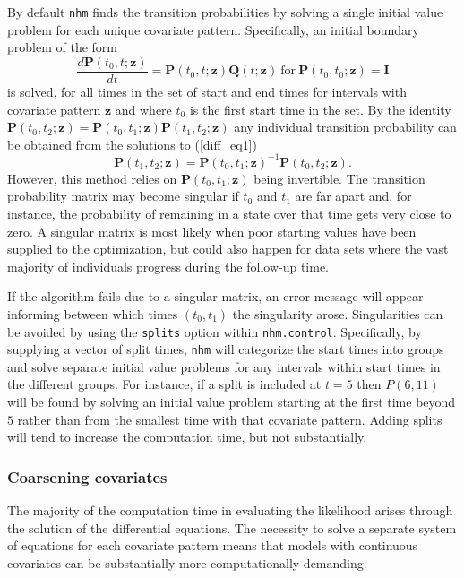\documentclass{article}
\numberwithin{equation}{section}
\begin{document}
By default \verb!nhm! finds the transition probabilities by solving a single initial value problem for each unique covariate pattern. Specifically, an initial boundary problem of the form
\begin{equation}\frac{d\mathbf{P}(t_0, t ; \mathbf{z})}{dt} = \mathbf{P}(t_0,t ; \mathbf{z})\mathbf{Q}(t ;  \mathbf{z}) ~ \mbox{for}  ~ \mathbf{P}(t_0,t_0 ; \mathbf{z}) = \mathbf{I} \label{diff_eq1} \end{equation}
is solved, for all times in the set of start and end times for intervals with covariate pattern $\mathbf{z}$ and where $t_0$ is the first start time in the set.
By the identity $\mathbf{P}(t_0 , t_2; \mathbf{z}) = \mathbf{P}(t_0 , t_1; \mathbf{z})\mathbf{P}(t_1 , t_2; \mathbf{z})$ any individual transition probability can be obtained from the solutions to (\ref{diff_eq1})
$$\mathbf{P}(t_1 , t_2; \mathbf{z}) = \mathbf{P}(t_0 , t_1; \mathbf{z})^{-1}\mathbf{P}(t_0 , t_2; \mathbf{z}).$$
However, this method relies on $\mathbf{P}(t_0 , t_1; \mathbf{z})$ being invertible. The transition probability matrix may become singular if $t_0$ and $t_1$ are far apart and, for instance, the probability of remaining in a state over that time gets very close to zero. A singular matrix is most likely when poor starting values have been supplied to the optimization, but could also happen for data sets where the vast majority of individuals progress during the follow-up time.

If the algorithm fails due to a singular matrix, an error message will appear informing between which times $(t_0, t_1)$ the singularity arose. Singularities can be avoided by using the \verb!splits! option within \verb!nhm.control!. Specifically, by supplying a vector of split times, \verb!nhm! will categorize the start times into groups and solve separate initial value problems for any intervals within start times in the different groups. For instance, if a split is included at $t=5$ then $P(6,11)$ will be found by solving an initial value problem starting at the first time beyond $5$ rather than from the smallest time with that covariate pattern. Adding splits will tend to increase the computation time, but not substantially.

\subsubsection{Coarsening covariates}

The majority of the computation time in evaluating the likelihood arises through the solution of the differential equations. The necessity to solve a separate system of equations for each covariate pattern means that models with continuous covariates can be substantially more computationally demanding.
\end{document}
